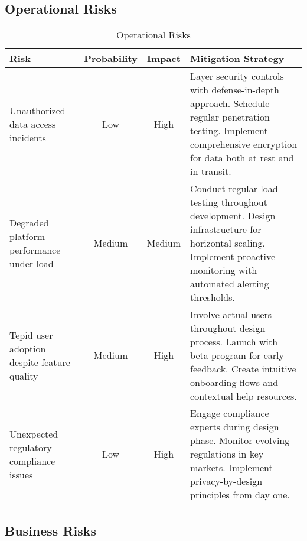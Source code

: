 \documentclass[12pt,a4paper]{article}
\begin{document}
\subsection{Operational Risks}

\begin{table}[h]
\begin{tabularx}{\textwidth}{|X|c|c|X|}
\hline
\textbf{Risk} & \textbf{Probability} & \textbf{Impact} & \textbf{Mitigation Strategy} \\
\hline
Unauthorized data access incidents & Low & High & Layer security controls with defense-in-depth approach. Schedule regular penetration testing. Implement comprehensive encryption for data both at rest and in transit. \\
\hline
Degraded platform performance under load & Medium & Medium & Conduct regular load testing throughout development. Design infrastructure for horizontal scaling. Implement proactive monitoring with automated alerting thresholds. \\
\hline
Tepid user adoption despite feature quality & Medium & High & Involve actual users throughout design process. Launch with beta program for early feedback. Create intuitive onboarding flows and contextual help resources. \\
\hline
Unexpected regulatory compliance issues & Low & High & Engage compliance experts during design phase. Monitor evolving regulations in key markets. Implement privacy-by-design principles from day one. \\
\hline
\end{tabularx}
\caption{Operational Risks}
\end{table}

\subsection{Business Risks}
\end{document}
